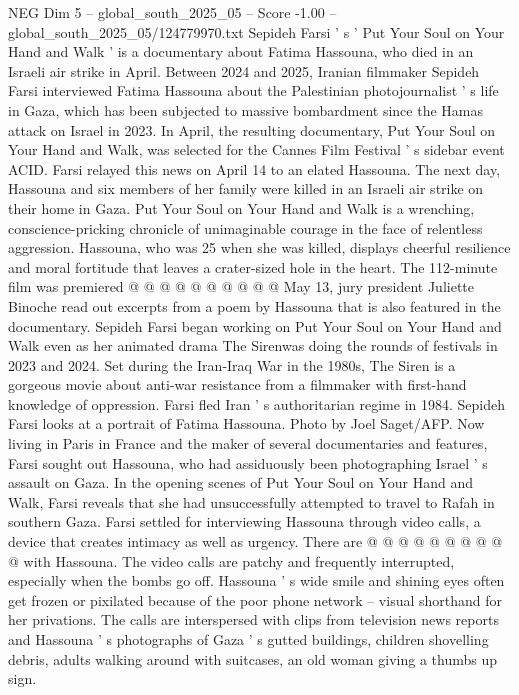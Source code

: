 \begin{textsample}{NEG Dim 5 – global\_south\_2025\_05 – Score -1.00 – global\_south\_2025\_05/124779970.txt}  \label{ex:f5_neg_261}
Sepideh Farsi ' s ' Put Your Soul on Your Hand and Walk ' is a documentary about Fatima Hassouna, who died in an Israeli air strike in April.
Between 2024 and 2025, Iranian filmmaker Sepideh Farsi interviewed Fatima Hassouna about the Palestinian photojournalist ' s life in Gaza, which has been subjected to massive bombardment since the Hamas attack on Israel in 2023.
In April, the resulting documentary, Put Your Soul on Your Hand and Walk, was selected for the Cannes Film Festival ' s sidebar event ACID.
Farsi relayed this news on April 14 to an elated Hassouna.
The next day, Hassouna and six members of her family were killed in an Israeli air strike on their home in Gaza.
Put Your Soul on Your Hand and Walk is a wrenching, conscience-pricking chronicle of unimaginable courage in the face of relentless aggression.
Hassouna, who was 25 when she was killed, displays cheerful resilience and moral fortitude that leaves a crater-sized hole in the heart.
The 112-minute film was premiered @ @ @ @ @ @ @ @ @ @ May 13, jury president Juliette Binoche read out excerpts from a poem by Hassouna that is also featured in the documentary.
Sepideh Farsi began working on Put Your Soul on Your Hand and Walk even as her animated drama The Sirenwas doing the rounds of festivals in 2023 and 2024.
Set during the Iran-Iraq War in the 1980s, The Siren is a gorgeous movie about anti-war resistance from a filmmaker with first-hand knowledge of oppression.
Farsi fled Iran ' s authoritarian regime in 1984.
Sepideh Farsi looks at a portrait of Fatima Hassouna.
Photo by Joel Saget/AFP.
Now living in Paris in France and the maker of several documentaries and features, Farsi sought out Hassouna, who had assiduously been photographing Israel ' s assault on Gaza.
In the opening scenes of Put Your Soul on Your Hand and Walk, Farsi reveals that she had unsuccessfully attempted to travel to Rafah in southern Gaza.
Farsi settled for interviewing Hassouna through video calls, a device that creates intimacy as well as urgency.
There are @ @ @ @ @ @ @ @ @ @ with Hassouna.
The video calls are patchy and frequently interrupted, especially when the bombs go off.
Hassouna ' s wide smile and shining eyes often get frozen or pixilated because of the poor phone network -- visual shorthand for her privations.
The calls are interspersed with clips from television news reports and Hassouna ' s photographs of Gaza ' s gutted buildings, children shovelling debris, adults walking around with suitcases, an old woman giving a thumbs up sign.

\end{textsample}

